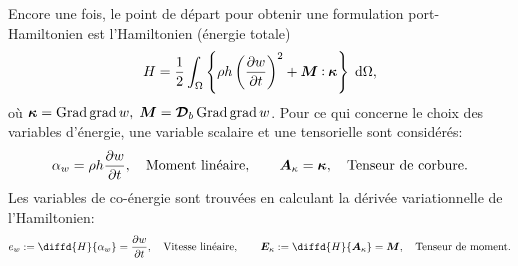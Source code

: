 Encore une fois, le point de départ pour obtenir une formulation port-Hamiltonien est l'Hamiltonien (énergie totale)
\begin{equation*}
H = \frac{1}{2} \int_{\Omega} \left\{\rho h \left(\diffp{w}{t} \right)^2 + \bm{M} \cddot \bm{\kappa}  \right\}  \d{\Omega},
\end{equation*}
où $ \bm{\kappa} = \operatorname*{Grad}\operatorname*{grad}{w}, \; \bm{M} = \bm{\mathcal{D}}_b \operatorname*{Grad}\operatorname*{grad}{w}$. Pour ce qui concerne le choix des variables d'énergie, une variable scalaire et une tensorielle sont considérés:
\begin{equation*}
\alpha_w = \rho h \diffp{w}{t}, \quad \text{Moment linéaire}, \qquad \bm{A}_{\kappa} = \bm{\kappa}, \quad \text{Tenseur de corbure}.	
\end{equation*}
Les variables de co-énergie sont trouvées en calculant la dérivée variationnelle de l'Hamiltonien:
\begin{equation*}
e_w := \diffd{H}{\alpha_w} = \diffp{w}{t}, \quad \text{Vitesse linéaire},  \qquad  \bm{E}_{\kappa} := \diffd{H}{\bm{A}_{\kappa}} = \bm{M}, \quad \text{Tenseur de moment}.
\end{equation*}

